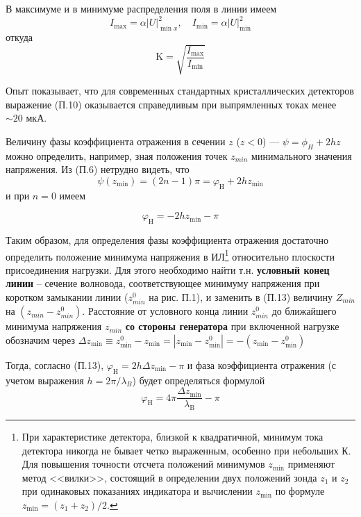 ﻿\documentclass[a4paper,11pt]{article}
\begin{document}
В максимуме и в минимуме распределения поля в линии имеем
\begin{equation}
	I _ { \max } = \alpha | U | _ { \min x } ^ { 2 } , \quad I _ { \min } = \alpha | U | _ { \min } ^ { 2 }
\end{equation}
откуда
\begin{equation}
	\mathrm { K } = \sqrt { \frac { I _ { \mathrm { max } } } { I _ { \mathrm { min } } } }
\end{equation}

Опыт показывает, что для современных стандартных кристаллических детекторов выражение (П.10) оказывается справедливым при выпрямленных токах менее $\sim20$ мкА.

Величину фазы коэффициента отражения в сечении $z$ ($z<0$) --- $\psi=\phi_H+2hz$ можно определить, например, зная положения точек $z_{min}$ минимального значения напряжения. Из (П.6) нетрудно видеть, что
\begin{equation}
	\psi \left( z _ { \min } \right) = ( 2 n - 1 ) \pi = \varphi _ { \mathrm { H } } + 2 h z _ { \min }
\end{equation}
и при $n = 0$ имеем

\begin{equation}
	\varphi _ { \mathrm { H } } = - 2 h z _ { \mathrm { min } } - \pi
\end{equation}

Таким образом, для определения фазы коэффициента отражения достаточно определить положение минимума напряжения в ИЛ\footnote{При характеристике детектора, близкой к квадратичной, минимум тока детектора никогда не бывает четко выраженным, особенно при небольших К. Для повышения точности отсчета положений минимумов $z_{\min}$ применяют метод <<вилки>>, состоящий в определении двух положений зонда $z_1$ и $z_2$ при одинаковых показаниях индикатора и вычислении $z_{\min}$ по формуле $z_{\min}=(z_1+z_2)/2$.} относительно плоскости присоединения нагрузки. 
%
Для этого необходимо найти т.н. \textbf{условный конец линии} -- сечение волновода, соответствующее минимуму напряжения при коротком замыкании линии ($z^0_{min}$ на рис. П.1), и заменить в (П.13) величину $Z_{min}$ на $(z_{min}-z_{min}^0)$. 
Расстояние от условного конца линии $z^0_{min}$ до ближайшего минимума напряжения $z_{min}$ \textbf{со стороны генератора} при включенной нагрузке обозначим через 
$\Delta z _ { \min } \equiv z _ { \min } ^ { 0 } - z _ { \min } = \left| z _ { \min } - z _ { \min } ^ { 0 } \right| =- \left( z _ { \min } - z _ { \min } ^ { 0 } \right)$

Тогда, согласно (П.13),  $\varphi _ { \mathrm { H } } = 2 h \Delta z _ { \mathrm { min } } - \pi$ и фаза коэффициента отражения (с учетом выражения $h=2\pi/\lambda_B$) будет определяться формулой
\begin{equation}
	\varphi _ { \mathrm { H } } = 4 \pi \frac { \Delta z _ { \mathrm { min } } } { \lambda _ { \mathrm { B } } } - \pi
\end{equation}
\end{document}
